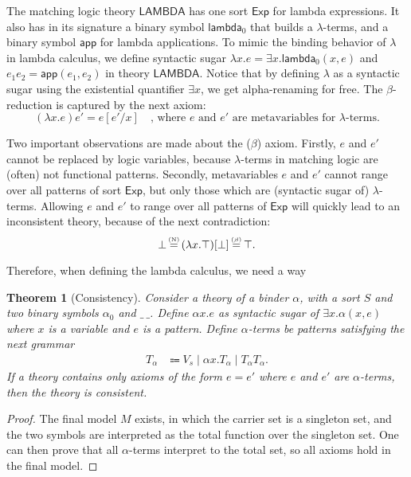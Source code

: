 \documentclass[UTF8]{article}
\newcounter{thmcounter}
\theoremstyle{plain}
\newtheorem{theorem}[thmcounter]{Theorem}
\theoremstyle{definition}
\theoremstyle{remark}
\newcommand{\LAMBDA}{\mathsf{LAMBDA}}
\newcommand{\xeq}[1]
    {\stackrel{\mathclap{\normalfont\tiny\mbox{#1}}}{=}}
\begin{document}
The matching logic theory $\LAMBDA$ has one sort $\mathsf{Exp}$ for lambda expressions. It also has in its signature a binary symbol $\mathsf{lambda}_0$ that builds a $\lambda$-terms, and a binary symbol $\mathsf{app}$ for lambda applications. To mimic the binding behavior of $\lambda$ in lambda calculus, we define syntactic sugar $\lambda x . e = \exists x . \mathsf{lambda}_0(x, e)$  and $e_1e_2 = \mathsf{app}(e_1, e_2)$ in theory $\LAMBDA$. Notice that by defining $\lambda$ as a syntactic sugar using the existential quantifier $\exists x$, we get alpha-renaming for free. The $\beta$-reduction is captured by the next axiom:
\begin{equation*}
(\lambda x . e)e' = e[e'/x] \quad \text{, where $e$ and $e'$ are metavariables for $\lambda$-terms.}
\end{equation*}

Two important observations are made about the ($\beta$) axiom. Firstly, $e$ and $e'$ cannot be replaced by logic variables, because $\lambda$-terms in matching logic are (often) not functional patterns. Secondly, metavariables $e$ and $e'$ cannot range over all patterns of sort $\mathsf{Exp}$, but only those which are (syntactic sugar of) $\lambda$-terms. Allowing $e$ and $e'$ to range over all patterns of $\mathsf{Exp}$ will quickly lead to an inconsistent theory, because of the next contradiction:
\begin{equation*}
\bot 
\xeq{(N)} (\lambda x . \top)[\bot]
\xeq{($\beta$)} \top.
\end{equation*}

Therefore, when defining the lambda calculus, we need a way 

\begin{theorem}[Consistency]
	Consider a theory of a binder $\alpha$, with a sort $S$ and two binary symbols $\alpha_0$ and $\_ \ \_$. Define $\alpha x . e$ as syntactic sugar of $\exists x . \alpha (x, e)$ where $x$ is a variable and $e$ is a pattern. Define $\alpha$-terms be patterns satisfying the next grammar 
	\begin{align*}
      T_\alpha &\Coloneqq V_s \mid \alpha x .T_\alpha \mid T_\alpha T_\alpha.
	\end{align*}
	If a theory contains only axioms of the form $e = e'$ where $e$ and $e'$ are $\alpha$-terms, then the theory is consistent.
\end{theorem}
\begin{proof}
	The final model $M$ exists, in which the carrier set is a singleton set, and the two symbols are interpreted as the total function over the singleton set. One can then prove that all $\alpha$-terms interpret to the total set, so all axioms hold in the final model.
\end{proof}
\end{document}

